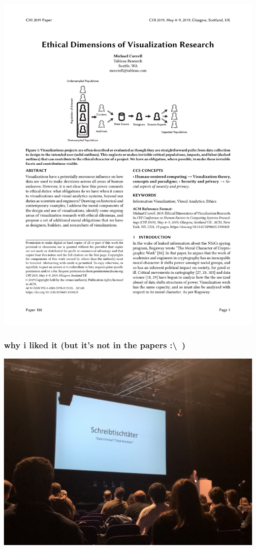 \documentclass[aspectratio=169,10pt]{beamer} %
\begin{document}
\begin{frame}[t] %
\includegraphics[width=\textwidth]{pdfs/ethical_dimensions.pdf}
\end{frame}

\begin{frame}\frametitle{why i liked it (but it's not in the papers :\textbackslash~)}
    \includegraphics[width=\textwidth]{figures/IMG_9728.jpeg}
\end{frame}
\end{document}
